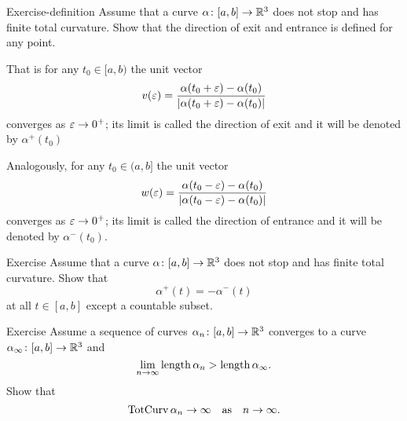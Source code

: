 \begin{thm}{Exercise-definition} 
Assume that a curve $\alpha\colon[a,b]\to\mathbb{R}^3$ does not stop and has finite total curvature.
Show that the direction of exit and entrance is defined for any point.

That is for any $t_0\in [a,b)$ the unit vector  
\[v(\varepsilon)=\frac{\alpha(t_0+\varepsilon)-\alpha(t_0)}{|\alpha(t_0+\varepsilon)-\alpha(t_0)|}\] converges as $\varepsilon\to0^+$;
its limit is called the direction of exit and it will be denoted by $\alpha^+(t_0)$

Analogously, for any $t_0\in (a,b]$ the unit vector  
\[w(\varepsilon)=\frac{\alpha(t_0-\varepsilon)-\alpha(t_0)}{|\alpha(t_0-\varepsilon)-\alpha(t_0)|}\] 
converges as $\varepsilon\to0^+$;
its limit is called the direction of entrance and it will be denoted by $\alpha^-(t_0)$.
\end{thm}

\begin{thm}{Exercise} 
Assume that a curve $\alpha\colon[a,b]\to\mathbb{R}^3$ does not stop and has finite total curvature.
Show that 
\[\alpha^+(t)=-\alpha^-(t)\]
at all $t\in[a,b]$ except a countable subset.
\end{thm}

\begin{thm}{Exercise} 
Assume a sequence of curves $\alpha_n\colon[a,b]\to\mathbb{R}^3$ converges to a curve $\alpha_\infty\colon[a,b]\to\mathbb{R}^3$ and
\[\lim_{n\to\infty}\mathop{\rm length}\nolimits\alpha_n>\mathop{\rm length}\nolimits\alpha_\infty.\]
Show that 
\[\mathop{\rm TotCurv}\nolimits\alpha_n\to\infty\quad\text{as}\quad n\to\infty.\]

\end{thm}



